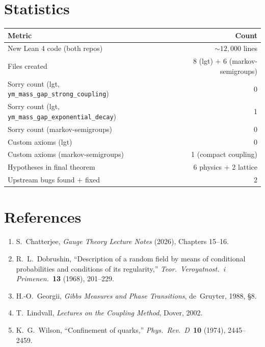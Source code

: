 \documentclass[11pt,a4paper]{article}
\theoremstyle{definition}
\begin{document}
\section{Statistics}

\begin{table}[h]
\centering
\begin{tabular}{lr}
\toprule
Metric & Count \\
\midrule
New Lean 4 code (both repos) & ${\sim}12{,}000$ lines \\
Files created & 8 (lgt) $+$ 6 (markov-semigroups) \\
Sorry count (lgt, \texttt{ym\_mass\_gap\_strong\_coupling}) & 0 \\
Sorry count (lgt, \texttt{ym\_mass\_gap\_exponential\_decay}) & 1 \\
Sorry count (markov-semigroups) & 0 \\
Custom axioms (lgt) & 0 \\
Custom axioms (markov-semigroups) & 1 (compact coupling) \\
Hypotheses in final theorem & 6 physics $+$ 2 lattice \\
Upstream bugs found $+$ fixed & 2 \\
\bottomrule
\end{tabular}
\end{table}

\section*{References}

\begin{enumerate}
\item S.~Chatterjee, \emph{Gauge Theory Lecture Notes} (2026),
  Chapters 15--16.
\item R.~L.~Dobrushin, ``Description of a random field by means
  of conditional probabilities and conditions of its regularity,''
  \emph{Teor.\ Veroyatnost.\ i Primenen.}\ \textbf{13} (1968),
  201--229.
\item H.-O.~Georgii, \emph{Gibbs Measures and Phase Transitions},
  de~Gruyter, 1988, \S8.
\item T.~Lindvall, \emph{Lectures on the Coupling Method}, Dover, 2002.
\item K.~G.~Wilson, ``Confinement of quarks,''
  \emph{Phys.\ Rev.\ D}~\textbf{10} (1974), 2445--2459.
\end{enumerate}
\end{document}
